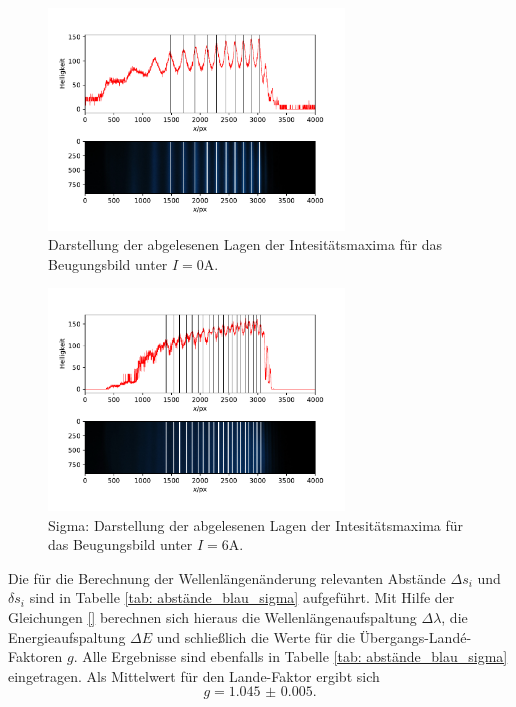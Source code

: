 \begin{figure}
  \centering
  \includegraphics[width = 0.7\textwidth]{../Messdaten/plots/peaks_blau_sigma_0.pdf}
  \caption{Darstellung der abgelesenen Lagen der Intesitätsmaxima für das Beugungsbild unter $I =0$A.}
  \label{fig: peaks_blau_0}
\end{figure}
\begin{figure}
  \centering
  \includegraphics[width = 0.7\textwidth]{../Messdaten/plots/peaks_blau_sigma_6.pdf}
  \caption{Sigma: Darstellung der abgelesenen Lagen der Intesitätsmaxima für das Beugungsbild unter $I =6$A.}
  \label{fig: peaks_blau_sigma_6}
\end{figure}
Die für die Berechnung der Wellenlängenänderung relevanten Abstände $\Delta s_i$ und $\delta s_i$ sind in Tabelle \ref{tab: abstände_blau_sigma}
aufgeführt. Mit Hilfe der Gleichungen \eqref{} berechnen sich hieraus die Wellenlängenaufspaltung $\Delta \lambda$, die
Energieaufspaltung $\Delta E$ und schließlich die Werte für die Übergangs-Landé-Faktoren $g$. Alle Ergebnisse sind ebenfalls in
Tabelle \ref{tab: abstände_blau_sigma} eingetragen. Als Mittelwert für den Lande-Faktor ergibt sich
\begin{equation}
  g = \num{1.045(5)}.
\end{equation}

